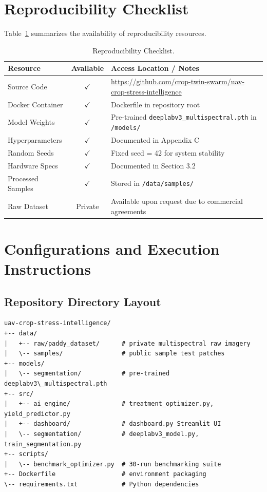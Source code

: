 \documentclass[review,3p,times,authoryear]{elsarticle}
\begin{document}
\section{Reproducibility Checklist}
Table~\ref{tab:reproducibility} summarizes the availability of reproducibility resources.

\begin{table}[H]
\centering
\caption{Reproducibility Checklist.}
\label{tab:reproducibility}
\begin{tabular}{lcl}
\toprule
Resource & Available & Access Location / Notes \\
\midrule
Source Code & $\checkmark$ & \url{https://github.com/crop-twin-swarm/uav-crop-stress-intelligence} \\
Docker Container & $\checkmark$ & Dockerfile in repository root \\
Model Weights & $\checkmark$ & Pre-trained \texttt{deeplabv3\_multispectral.pth} in \texttt{/models/} \\
Hyperparameters & $\checkmark$ & Documented in Appendix C \\
Random Seeds & $\checkmark$ & Fixed seed = 42 for system stability \\
Hardware Specs & $\checkmark$ & Documented in Section 3.2 \\
Processed Samples & $\checkmark$ & Stored in \texttt{/data/samples/} \\
Raw Dataset & Private & Available upon request due to commercial agreements \\
\bottomrule
\end{tabular}
\end{table}

\section{Configurations and Execution Instructions}

\subsection{Repository Directory Layout}
\begin{verbatim}
uav-crop-stress-intelligence/
+-- data/
|   +-- raw/paddy_dataset/      # private multispectral raw imagery
|   \-- samples/                # public sample test patches
+-- models/
|   \-- segmentation/           # pre-trained deeplabv3\_multispectral.pth
+-- src/
|   +-- ai_engine/              # treatment_optimizer.py, yield_predictor.py
|   +-- dashboard/              # dashboard.py Streamlit UI
|   \-- segmentation/           # deeplabv3_model.py, train_segmentation.py
+-- scripts/
|   \-- benchmark_optimizer.py  # 30-run benchmarking suite
+-- Dockerfile                  # environment packaging
\-- requirements.txt            # Python dependencies
\end{verbatim}
\end{document}
